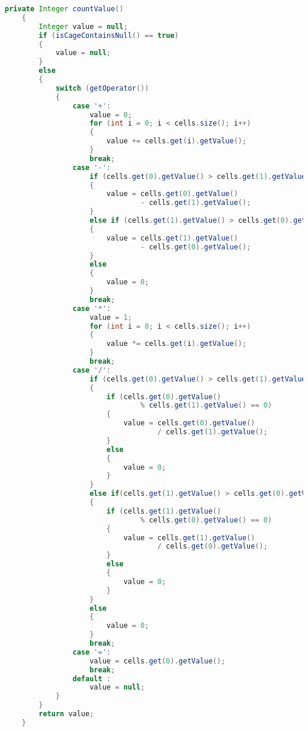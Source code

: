\begin{lstlisting}[language=Java,basicstyle=\tiny,caption=Cage.java]
    private Integer countValue()
    {
        Integer value = null;
        if (isCageContainsNull() == true)
        {
            value = null;
        }
        else
        {
            switch (getOperator())
            {
                case '+':
                    value = 0;
                    for (int i = 0; i < cells.size(); i++)
                    {
                        value += cells.get(i).getValue();
                    }
                    break;
                case '-':
                    if (cells.get(0).getValue() > cells.get(1).getValue())
                    {
                        value = cells.get(0).getValue() 
                                - cells.get(1).getValue();
                    }
                    else if (cells.get(1).getValue() > cells.get(0).getValue())
                    {
                        value = cells.get(1).getValue() 
                                - cells.get(0).getValue();
                    }
                    else
                    {
                        value = 0;
                    }
                    break;
                case '*':
                    value = 1;
                    for (int i = 0; i < cells.size(); i++)
                    {
                        value *= cells.get(i).getValue();
                    }
                    break;
                case '/':
                    if (cells.get(0).getValue() > cells.get(1).getValue())
                    {
                        if (cells.get(0).getValue() 
                                % cells.get(1).getValue() == 0)
                        {
                            value = cells.get(0).getValue() 
                                    / cells.get(1).getValue();
                        }
                        else
                        {
                            value = 0;
                        }
                    }
                    else if(cells.get(1).getValue() > cells.get(0).getValue())
                    {
                        if (cells.get(1).getValue() 
                                % cells.get(0).getValue() == 0)
                        {
                            value = cells.get(1).getValue() 
                                    / cells.get(0).getValue();
                        }
                        else
                        {
                            value = 0;
                        }
                    }
                    else
                    {
                        value = 0;
                    }
                    break;
                case '=':
                    value = cells.get(0).getValue();
                    break;
                default :
                    value = null;
            }
        }
        return value;
    }
    

\end{lstlisting}
